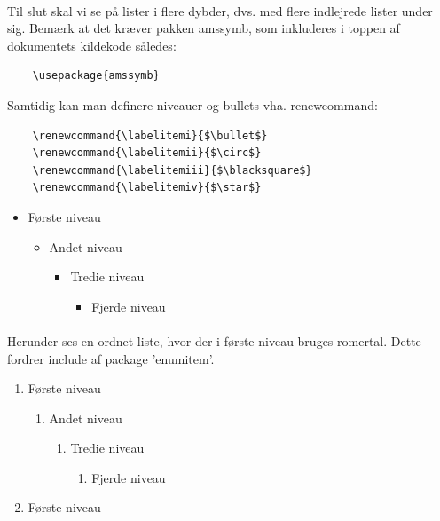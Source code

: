 \documentclass{article}
\renewcommand{\labelitemi}{$\bullet$}
\renewcommand{\labelitemii}{$\circ$}
\renewcommand{\labelitemiii}{$\blacksquare$}
\renewcommand{\labelitemiv}{$\star$}
\begin{document}
\begin{enumerate}
\paragraph{}
Til slut skal vi se på lister i flere dybder, dvs. med flere indlejrede lister under sig. Bemærk at det kræver pakken amssymb, som inkluderes i toppen af dokumentets kildekode således:
\begin{verbatim}
    \usepackage{amssymb}
\end{verbatim} 
Samtidig kan man definere niveauer og bullets vha. renewcommand:
\begin{verbatim}
    \renewcommand{\labelitemi}{$\bullet$}
    \renewcommand{\labelitemii}{$\circ$}
    \renewcommand{\labelitemiii}{$\blacksquare$}
    \renewcommand{\labelitemiv}{$\star$}
\end{verbatim}
\begin{itemize}
    \item Første niveau
    \begin{itemize}
        \item Andet niveau
        \begin{itemize}
            \item Tredie niveau
            \begin{itemize}
                \item Fjerde niveau
            \end{itemize}
        \end{itemize}
    \end{itemize}
\end{itemize}
\paragraph{}
Herunder ses en ordnet liste, hvor der i første niveau bruges romertal. Dette fordrer include af package 'enumitem'.
\begin{enumerate}[label=\Roman*]
    \item Første niveau
    \begin{enumerate}
        \item Andet niveau
        \begin{enumerate}
            \item Tredie niveau
            \begin{enumerate}
                \item Fjerde niveau
            \end{enumerate}
        \end{enumerate}
    \end{enumerate}
    \item Første niveau
\end{enumerate}

\end{enumerate}
\end{document}
